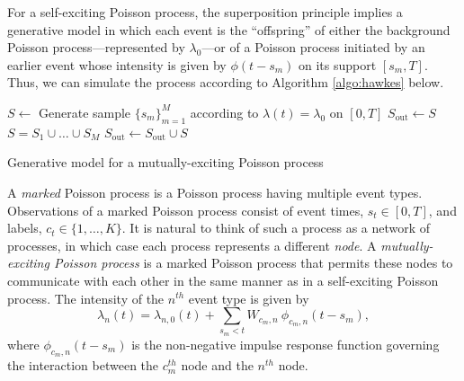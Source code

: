 		For a self-exciting Poisson process, the superposition principle implies a generative model in which each event is the ``offspring'' of either the background Poisson process---represented by $\lambda_0$---or of a Poisson process initiated by an earlier event whose intensity is given by $\phi(t-s_m)$ on its support $[s_m, T]$. Thus, we can simulate the process according to Algorithm \ref{algo:hawkes} below.

		\begin{algorithm}
				\begin{algorithmic}
					\vspace{1mm}
					\STATE $S \gets$ Generate sample $\{s_m\}_{m=1}^M$ according to $\lambda(t) = \lambda_0$ on $[0, T]$
					\STATE $S_{\text{out}} \gets S$
					\REPEAT
						\ENDFOR
					\STATE $S = S_1 \cup \dots \cup S_M$
					\STATE $S_{\text{out}} \gets S_{\text{out}} \cup S$
			\end{algorithmic}
			\caption{Generative model for a mutually-exciting Poisson process}
			\label{algo:hawkes}
		\end{algorithm}

		A \textit{marked} Poisson process is a Poisson process having multiple event types. Observations of a marked Poisson process consist of event times, $s_t \in [0, T]$, and labels, $c_t \in \{1, \dots, K\}$. It is natural to think of such a process as a network of processes, in which case each process represents a different \textit{node}. A \textit{mutually-exciting Poisson process} is a marked Poisson process that permits these nodes to communicate with each other in the same manner as in a self-exciting Poisson process. The intensity of the $n^{th}$ event type is given by
		\begin{equation} \label{eq:hawkes-intensity}
			\lambda_{n}(t) = \lambda_{n, 0}(t) + \sum_{s_m < t} W_{c_m, n} \ \phi_{c_m, n}(t-s_m),
		\end{equation}
		where $\phi_{c_m, n}(t-s_m)$ is the non-negative impulse response function governing the interaction between the $c_m^{th}$ node and the $n^{th}$ node.

